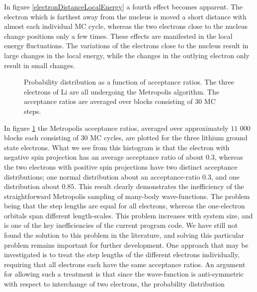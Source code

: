 In figure \ref{electronDistanceLocalEnergy} a fourth effect becomes
apparent. The electron which is farthest away from the nucleus is
moved a short distance with almost each individual MC cycle, whereas
the two electrons close to the nucleus change positions only a few
times. These effects are manifested in the local energy
fluctuations. The variations of the electrons close to the nucleus
result in large changes in the local energy, while the changes in the
outlying electron only result in small changes.
\newline

\begin{figure}[htbp]
  
  \caption{Probability distribution as a function of acceptance ratios.
  The three electrons of Li are all undergoing the Metropolis
  algorithm. The acceptance ratios are averaged over blocks consisting 
  of 30 MC steps. }
  \label{acceptanceDistanceHistogram}
\end{figure}

In figure \ref{acceptanceDistanceHistogram} the Metropolis acceptance
ratios, averaged over approximately $11$ $000$ blocks each consisting
of $30$ MC cycles, are plotted for the three lithium ground state
electrons. What we see from this histogram is that the electron with
negative spin projection has an average acceptance ratio of about
$0.3$, whereas the two electrons with positive spin projections have
two distinct acceptance distributions; one normal distribution about
an acceptance-ratio $0.3$, and one distribution about $0.85$. This
result clearly demonstrates the inefficiency of the straightforward
Metropolis sampling of many-body wave-functions. The problem being
that the step lengths are equal for all electrons, whereas the
one-electron orbitals span different length-scales.
\newline
%
\newline
This problem increases with system size, and is one of the key
inefficiencies of the current program code. We have still not found
the solution to this problem in the literature, and solving this
particular problem remains important for further development. One
approach that may be investigated is to treat the step
lengths of the different electrons individually, requiring that all
electrons each have the same acceptance ratios. An
argument for allowing such a treatment is that since the
wave-function is anti-symmetric with respect to interchange of two
electrons, the probability distribution

